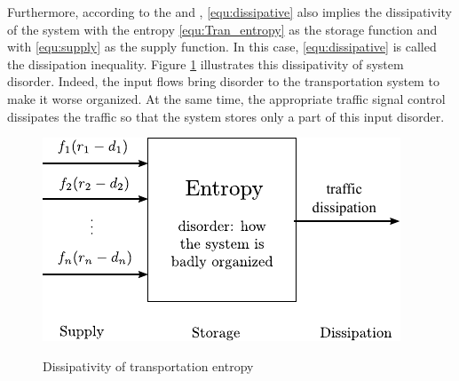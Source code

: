 \documentclass[preprint,authoryear,12pt]{elsarticle}
\begin{document}
Furthermore, according to the \citet{willems_dissipative_1972} and
\citet{hill_dissipative_1980}, \eqref{equ:dissipative} also implies
the dissipativity of the system with the entropy \eqref{equ:Tran_entropy} as the
storage function and with \eqref{equ:supply} as the supply function.
In this case, \eqref{equ:dissipative} is called the dissipation  
inequality. Figure \ref{fig:trans_dis} illustrates this dissipativity
of system disorder. Indeed, the input flows bring disorder to the
transportation system to make it worse organized. At the same time,
the appropriate traffic signal control dissipates the traffic so that
the system stores only a part of this input disorder.
\begin{figure}[ht]
  \centering
  \includegraphics{pics/trans_dis}\\
  \caption{Dissipativity of transportation entropy}
  \label{fig:trans_dis}
\end{figure}
\end{document}
